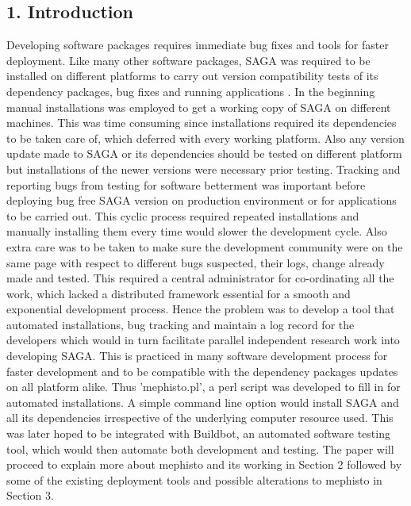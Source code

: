 \documentclass[a4paper,10pt]{article}
\begin{document}
\begin{multicols}{2}
\section*{\normalsize 1. Introduction}
Developing software packages requires immediate bug fixes and tools for faster deployment. Like many other software packages, SAGA 
was required to be installed on different platforms to carry out version compatibility tests of its dependency packages, bug fixes and running applications . 
In the beginning manual installations was employed to get a working copy of SAGA on different machines. This was time consuming 
since installations required its dependencies to be taken care of, which deferred with every working platform. Also any version update made to SAGA 
or its dependencies should be tested on different platform but installations of the newer versions were necessary prior testing. Tracking and reporting 
bugs from testing for software betterment was important before deploying bug free SAGA version on production environment or for applications
to be carried out. This cyclic process required repeated installations and manually installing them every time would slower the development
cycle. Also extra care was to be taken to make sure the development community were on the same page with respect to different bugs suspected,
their logs, change already made and tested. This required a central administrator for co-ordinating all the work, which lacked
a distributed framework essential for a smooth and exponential development process. Hence the problem was to develop a tool that automated 
installations, bug tracking and maintain a log record for the developers which would in turn facilitate parallel independent research work into
developing SAGA. This is practiced in many software development process for faster development and to be compatible with the dependency 
packages updates on all platform alike. Thus 'mephisto.pl', a perl script was developed to fill in for automated installations.  
A simple command line option would install SAGA and all its dependencies irrespective of the underlying computer resource used. 
This was later hoped to be integrated with Buildbot, an automated software testing tool, which would then automate both development and testing. 
The paper will proceed to explain more about mephisto and its working in Section 2 followed by some of the existing deployment tools and possible 
alterations to mephisto in Section 3. 

\end{multicols}
\end{document}
